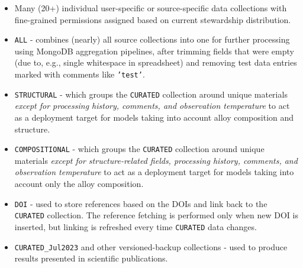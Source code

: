 \begin{itemize}
    \item Many (20+) individual user-specific or source-specific data collections with fine-grained permissions assigned based on current stewardship distribution. 


    \item \texttt{ALL} - combines (nearly) all source collections into one for further processing using MongoDB aggregation pipelines, after trimming fields that were empty (due to, e.g., single whitespace in spreadsheet) and removing test data entries marked with comments like \texttt{'test'}.


    \item \texttt{STRUCTURAL} - which groups the \texttt{CURATED} collection around unique materials \emph{except for processing history, comments, and observation temperature} to act as a deployment target for models taking into account alloy composition and structure.


    \item \texttt{COMPOSITIONAL} - which groups the \texttt{CURATED} collection around unique materials \emph{except for structure-related fields, processing history, comments, and observation temperature} to act as a deployment target for models taking into account only the alloy composition.


    \item \texttt{DOI} - used to store references based on the DOIs and link back to the \texttt{CURATED} collection. The reference fetching is performed only when new DOI is inserted, but linking is refreshed every time \texttt{CURATED} data changes.

    \item \texttt{CURATED\_Jul2023} and other versioned-backup collections - used to produce results presented in scientific publications.
\end{itemize}



